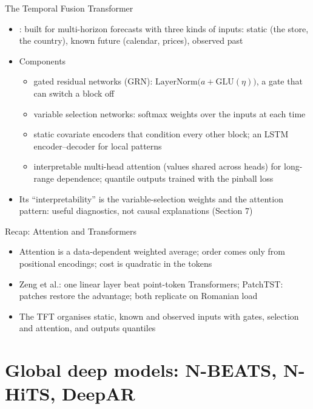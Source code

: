 \begin{frame}{The Temporal Fusion Transformer}
\itemsize{\small}
\begin{itemize}
    \item {}: built for multi-horizon forecasts with three kinds of inputs: static (the store, the country), known future (calendar, prices), observed past
    \item Components
    \begin{itemize}
        \item gated residual networks (GRN): $\mathrm{LayerNorm}\big(a + \mathrm{GLU}(\eta)\big)$, a gate that can switch a block off
        \item variable selection networks: softmax weights over the inputs at each time
        \item static covariate encoders that condition every other block; an LSTM encoder--decoder for local patterns
        \item interpretable multi-head attention (values shared across heads) for long-range dependence; quantile outputs trained with the pinball loss
    \end{itemize}
    \item Its ``interpretability'' is the variable-selection weights and the attention pattern: useful diagnostics, not causal explanations (Section 7)
\end{itemize}
\end{frame}

\begin{frame}{Recap: Attention and Transformers}
\itemsize{\small}
\begin{itemize}
    \item Attention is a data-dependent weighted average; order comes only from positional encodings; cost is quadratic in the tokens
    \item Zeng et al.: one linear layer beat point-token Transformers; PatchTST: patches restore the advantage; both replicate on Romanian load
    \item The TFT organises static, known and observed inputs with gates, selection and attention, and outputs quantiles
\end{itemize}
\end{frame}


\section{Global deep models: N-BEATS, N-HiTS, DeepAR}

